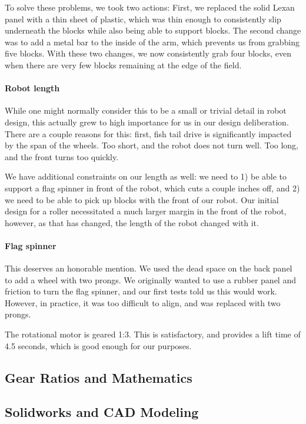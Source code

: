 To solve these problems, we took two actions: First, we replaced the solid Lexan panel with a thin sheet of plastic, which was thin enough to consistently slip underneath the blocks while also being able to support blocks. The second change was to add a metal bar to the inside of the arm, which prevents us from grabbing five blocks. With these two changes, we now consistently grab four blocks, even when there are very few blocks remaining at the edge of the field.

\paragraph{Robot length} While one might normally consider this to be a small or trivial detail in robot design, this actually grew to high importance for us in our design deliberation. There are a couple reasons for this: first, fish tail drive is significantly impacted by the span of the wheels. Too short, and the robot does not turn well. Too long, and the front turns too quickly.

We have additional constraints on our length as well: we need to 1) be able to support a flag spinner in front of the robot, which cuts a couple inches off, and 2) we need to be able to pick up blocks with the front of our robot. Our initial design for a roller necessitated a much larger margin in the front of the robot, however, as that has changed, the length of the robot changed with it. 

\paragraph{Flag spinner} This deserves an honorable mention. We used the dead space on the back panel to add a wheel with two prongs. We originally wanted to use a rubber panel and friction to turn the flag spinner, and our first tests told us this would work. However, in practice, it was too difficult to align, and was replaced with two prongs. 

The rotational motor is geared 1:3. This is satisfactory, and provides a lift time of 4.5 seconds, which is good enough for our purposes.

\subsection{Gear Ratios and Mathematics}
\subsection{Solidworks and CAD Modeling}
